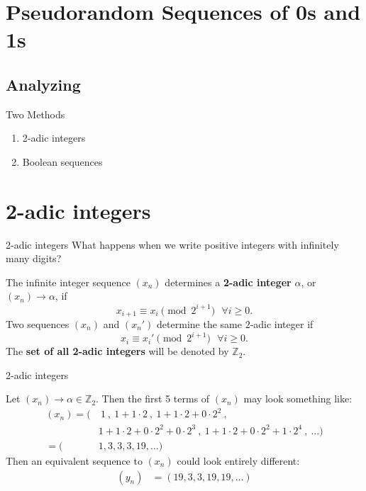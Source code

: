 \documentclass{beamer}
\def\zzz{\mathbb{Z}}
\def\xn{(x_n)}
\def\yn{(y_n)}
\begin{document}
\section{Pseudorandom Sequences of 0s and 1s}
\subsection{Analyzing}
\begin{frame}{Two Methods}
  \begin{enumerate}[1.]
      \pause
    \item 2-adic integers
      \pause
    \item Boolean sequences
  \end{enumerate}
\end{frame}

\section{2-adic integers}
\begin{frame}{2-adic integers}
  What happens when we write positive integers with infinitely many digits? \\
  \pause
  \begin{definition}
    The infinite integer sequence $\xn$
    determines a {\bf 2-adic integer} $\alpha$, or
    $\xn \rightarrow \alpha$, if
    \begin{equation} \label{eq:seq}
    x_{i+1} \equiv x_i\pmod{2^{i+1}} \ \ \ \forall i \geq 0.
    \end{equation}
    Two sequences $\xn$ and $(x_n')$ determine the same $2$-adic integer if 
  \begin{equation} \label{eq:equiv}
    x_i \equiv x_i' \pmod{2^{i+1}}\ \ \ \forall i \geq 0.
  \end{equation}
    The {\bf set of all 2-adic integers} will be denoted by $\zzz_2$.
  \end{definition}
\end{frame}

\begin{frame}{2-adic integers}
\begin{example} \label{ex:equiv-seq}
  Let $\xn \rightarrow \alpha \in \zzz_2$. Then the first 5 terms of
  $\xn$ may look something like:
  \begin{align*}
    \xn = (&\ 1\ , \ 1+1\cdot2 \ , \ 1+1\cdot2+0\cdot2^2 \ ,\\
            &1+1\cdot2+0\cdot2^2+0\cdot2^3 \ ,
            \ 1+1\cdot2+0\cdot2^2+1\cdot2^4 \ ,
              \ \dots)\\
        = (&1,3,3,3,19,\dots)
  \end{align*}
  Then an equivalent sequence to $\xn$ could look entirely different:
  \begin{align*}
    \yn &= (19,3,3,19,19,\dots) \\
  \end{align*}
\end{example}
\end{frame}
\end{document}
